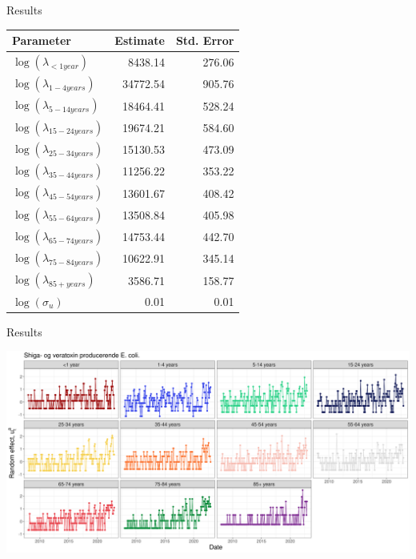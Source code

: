\documentclass[aspectratio=169]{beamer}
\begin{document}
\begin{frame}{Results}
\protect\hypertarget{results}{}
\tiny

\begin{table}
\centering\begingroup\fontsize{10}{12}\selectfont

\begin{tabular}{lrr}
\toprule
Parameter & Estimate & Std. Error\\
\midrule
$\log(\lambda_{<1 year})$ & 8438.14 & 276.06\\
$\log(\lambda_{1-4 years})$ & 34772.54 & 905.76\\
$\log(\lambda_{5-14 years})$ & 18464.41 & 528.24\\
$\log(\lambda_{15-24 years})$ & 19674.21 & 584.60\\
$\log(\lambda_{25-34 years})$ & 15130.53 & 473.09\\
$\log(\lambda_{35-44 years})$ & 11256.22 & 353.22\\
$\log(\lambda_{45-54 years})$ & 13601.67 & 408.42\\
$\log(\lambda_{55-64 years})$ & 13508.84 & 405.98\\
$\log(\lambda_{65-74 years})$ & 14753.44 & 442.70\\
$\log(\lambda_{75-84 years})$ & 10622.91 & 345.14\\
$\log(\lambda_{85+ years})$ & 3586.71 & 158.77\\
$\log(\sigma_u)$ & 0.01 & 0.01\\
\bottomrule
\end{tabular}
\endgroup{}
\end{table}

\normalsize
\end{frame}

\begin{frame}{Results}
\protect\hypertarget{results-1}{}
\tiny

\includegraphics[width=1\linewidth]{../figures/VTECxRandomEffects}

\normalsize
\end{frame}
\end{document}
